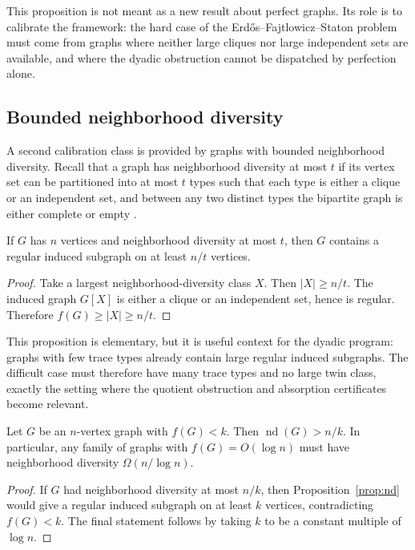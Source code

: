 \documentclass[thmsec,dntnbr,nolinenbrs]{dmgt}
\numberwithin{equation}{section}
\newcommand{\nd}{\operatorname{nd}}
\begin{document}
This proposition is not meant as a new result about perfect graphs.  Its role is to calibrate the framework: the hard case of the Erd\H{o}s--Fajtlowicz--Staton problem must come from graphs where neither large cliques nor large independent sets are available, and where the dyadic obstruction cannot be dispatched by perfection alone.

\subsection{Bounded neighborhood diversity}

A second calibration class is provided by graphs with bounded neighborhood diversity.  Recall that a graph has neighborhood diversity at most \(t\) if its vertex set can be partitioned into at most \(t\) types such that each type is either a clique or an independent set, and between any two distinct types the bipartite graph is either complete or empty \cite{Lampis2012}.

\begin{proposition}\label{prop:nd}
If \(G\) has \(n\) vertices and neighborhood diversity at most \(t\), then \(G\) contains a regular induced subgraph on at least \(n/t\) vertices.
\end{proposition}

\begin{proof}
Take a largest neighborhood-diversity class \(X\).  Then \(|X|\ge n/t\).  The induced graph \(G[X]\) is either a clique or an independent set, hence is regular.  Therefore \(f(G)\ge |X|\ge n/t\).
\end{proof}

This proposition is elementary, but it is useful context for the dyadic program: graphs with few trace types already contain large regular induced subgraphs.  The difficult case must therefore have many trace types and no large twin class, exactly the setting where the quotient obstruction and absorption certificates become relevant.

\begin{corollary}\label{cor:hard-structure}
Let \(G\) be an \(n\)-vertex graph with \(f(G)<k\).  Then \(\nd(G)>n/k\).  In particular, any family of graphs with \(f(G)=O(\log n)\) must have neighborhood diversity \(\Omega(n/\log n)\).
\end{corollary}

\begin{proof}
If \(G\) had neighborhood diversity at most \(n/k\), then Proposition~\ref{prop:nd} would give a regular induced subgraph on at least \(k\) vertices, contradicting \(f(G)<k\).  The final statement follows by taking \(k\) to be a constant multiple of \(\log n\).
\end{proof}
\end{document}
